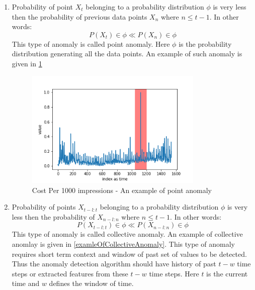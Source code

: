 \documentclass[12pt]{article}
\begin{document}
\begin{enumerate}
    \item Probability of point $X_t$ belonging to a probability distribution $\phi$ is very less then the probability of previous data points $X_n$ where $n \leq t-1$. In other words:\\
    \begin{equation}
        P(X_t) \in \phi  \ll P(X_n) \in \phi 
    \end{equation}
    This type of anomaly is called point anomaly. Here $\phi$ is the probability distribution generating all the data points. An example of such anomaly is given in \ref{examleOfPointAnomaly}
    \begin{figure}[H]
\centering
        \includegraphics[width=0.8\textwidth]{images/dataAnomalies/ad/exchange-3_cpm_results.png}
    \caption{Cost Per 1000 impressions - An example of point anomaly}
    \label{examleOfPointAnomaly}
\end{figure}	
    \item Probability of points $X_{t-l:t}$ belonging to a probability distribution $\phi$ is very less then the probability of $X_{n-l:n}$ where $n \leq t-1$. In other words: \\
    \begin{equation}
        P(X_{t-l:t}) \in \phi  \ll P(X_{n-l:n}) \in \phi         
    \end{equation}
        This type of anomaly is called collective anomaly. An example of collective anomlay is given in \ref{examleOfCollectiveAnomaly}. This type of anomaly requires short term context and window of past set of values to be detected. Thus the anomaly detection algorithm should have history of past $t-w$ time steps or extracted features from these $t-w$ time steps. Here $t$ is the current time and $w$ defines the window of time.
        \begin{figure}[H]

\end{figure}
\end{enumerate}
\end{document}
